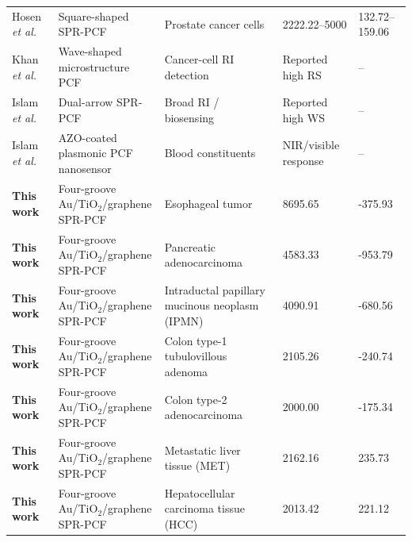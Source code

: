 \documentclass[5p,times,twocolumn]{elsarticle}
\begin{document}
\begin{table}[!t]
\begin{tabularx}{\textwidth}{@{}p{} p{} p{} p{} p{}@{}}
Hosen \textit{et al.}~\cite{Khan2025Prostate} 
& Square-shaped SPR-PCF 
& Prostate cancer cells 
& 2222.22--5000 
& 132.72--159.06 \\

Khan \textit{et al.}~\cite{Khan2023Cancer} 
& Wave-shaped microstructure PCF 
& Cancer-cell RI detection 
& Reported high RS 
& -- \\

Islam \textit{et al.}~\cite{Islam2023DualArrow} 
& Dual-arrow SPR-PCF 
& Broad RI / biosensing 
& Reported high WS 
& -- \\

Islam \textit{et al.}~\cite{Islam2022AZO} 
& AZO-coated plasmonic PCF nanosensor 
& Blood constituents 
& NIR/visible response 
& -- \\

\midrule
\textbf{This work} 
& Four-groove Au/TiO$_2$/graphene SPR-PCF 
& Esophageal tumor 
& 8695.65 
& -375.93 \\

\textbf{This work} 
& Four-groove Au/TiO$_2$/graphene SPR-PCF 
& Pancreatic adenocarcinoma 
& 4583.33 
& -953.79 \\

\textbf{This work} 
& Four-groove Au/TiO$_2$/graphene SPR-PCF 
& Intraductal papillary mucinous neoplasm (IPMN) 
& 4090.91 
& -680.56 \\

\textbf{This work} 
& Four-groove Au/TiO$_2$/graphene SPR-PCF 
& Colon type-1 tubulovillous adenoma 
& 2105.26 
& -240.74 \\

\textbf{This work} 
& Four-groove Au/TiO$_2$/graphene SPR-PCF 
& Colon type-2 adenocarcinoma 
& 2000.00 
& -175.34 \\

\textbf{This work} 
& Four-groove Au/TiO$_2$/graphene SPR-PCF 
& Metastatic liver tissue (MET) 
& 2162.16 
& 235.73 \\

\textbf{This work} 
& Four-groove Au/TiO$_2$/graphene SPR-PCF 
& Hepatocellular carcinoma tissue (HCC) 
& 2013.42 
& 221.12 \\

\bottomrule
\end{tabularx}
\end{table}
\end{document}
